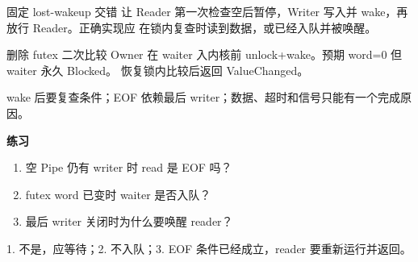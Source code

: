 
\begin{experimentbox}{固定 lost-wakeup 交错}
让 Reader 第一次检查空后暂停，Writer 写入并 wake，再放行 Reader。正确实现应
在锁内复查时读到数据，或已经入队并被唤醒。
\end{experimentbox}

\begin{faultinjectionbox}{删除 futex 二次比较}
Owner 在 waiter 入内核前 unlock+wake。预期 word=0 但 waiter 永久 Blocked。
恢复锁内比较后返回 ValueChanged。
\end{faultinjectionbox}

\begin{pitfallbox}
wake 后要复查条件；EOF 依赖最后 writer；数据、超时和信号只能有一个完成原因。
\end{pitfallbox}

\textbf{练习}
\begin{enumerate}[leftmargin=2.2em]
  \item 空 Pipe 仍有 writer 时 read 是 EOF 吗？
  \item futex word 已变时 waiter 是否入队？
  \item 最后 writer 关闭时为什么要唤醒 reader？
\end{enumerate}
\begin{answerbox}
1. 不是，应等待；2. 不入队；3. EOF 条件已经成立，reader 要重新运行并返回。
\end{answerbox}
